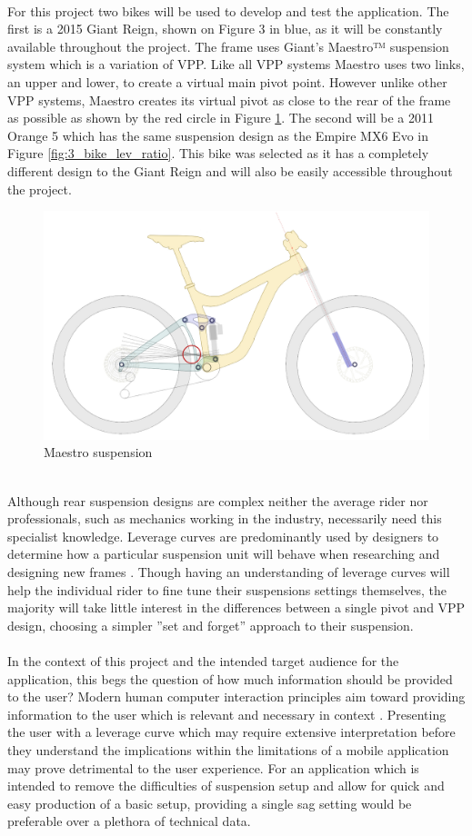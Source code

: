 		\\
		For this project two bikes will be used to develop and test the application. The first is a 2015 Giant Reign, shown on Figure 3 in blue, as it will be constantly available throughout the project. The frame uses Giant’s Maestro™ suspension system which is a variation of VPP. Like all VPP systems Maestro uses two links, an upper and lower, to create a virtual main pivot point. However unlike other VPP systems, Maestro creates its virtual pivot as close to the rear of the frame as possible as shown by the red circle in Figure \ref{fig:maestro}. The second will be a 2011 Orange 5 which has the same suspension design as the Empire MX6 Evo in Figure \ref{fig:3_bike_lev_ratio}. This bike was selected as it has a completely different design to the Giant Reign and will also be easily accessible throughout the project. 
		\begin{figure}[h!]
			\centering
			\includegraphics[width=12cm]{../images/reignsch.PNG}
			\caption{Maestro suspension}
			\label{fig:maestro}
		\end{figure}
		\\
		Although rear suspension designs are complex neither the average rider nor professionals, such as mechanics working in the industry, necessarily need this specialist knowledge. Leverage curves are predominantly used by designers to determine how a particular suspension unit will behave when researching and designing new frames \citep{creek2016curves}. Though having an understanding of leverage curves will help the individual rider to fine tune their suspensions settings themselves, the majority will take little interest in the differences between a single pivot and VPP design, choosing a simpler ”set and forget” approach to their suspension. 
		\\\\
		In the context of this project and the intended target audience for the application, this begs the question of how much information should be provided to the user? Modern human computer interaction principles aim toward providing information to the user which is relevant and necessary in context \citep{shneiderman2010designing}. Presenting the user with a leverage curve which may require extensive interpretation before they understand the implications within the limitations of a mobile application may prove detrimental to the user experience. For an application which is intended to remove the difficulties of suspension setup and allow for quick and easy production of a basic setup, providing a single sag setting would be preferable over a plethora of technical data.	

